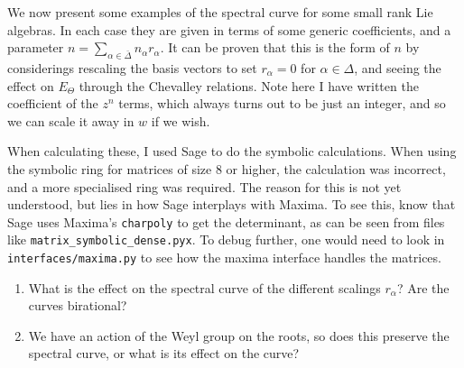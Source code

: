 \documentclass{article}
\begin{document}
We now present some examples of the spectral curve for some small rank Lie algebras. In each case they are given in terms of some generic coefficients, and a parameter $n = \sum_{\alpha \in \bar{\Delta}} n_\alpha r_\alpha$. It can be proven that this is the form of $n$ by considerings rescaling the basis vectors to set $r_\alpha=0$ for $\alpha \in \Delta$, and seeing the effect on $E_{\Theta}$ through the Chevalley relations.  
Note here I have written the coefficient of the $z^n$ terms, which always turns out to be just an integer, and so we can scale it away in $w$ if we wish. 
\begin{remark}
	When calculating these, I used Sage to do the symbolic calculations. When using the symbolic ring for matrices of size 8 or higher, the calculation was incorrect, and a more specialised ring was required. The reason for this is not yet understood, but lies in how Sage interplays with Maxima. To see this, know that Sage uses Maxima's \texttt{charpoly} to get the determinant, as can be seen from files like \texttt{matrix\_symbolic\_dense.pyx}. To debug further, one would need to look in \texttt{interfaces/maxima.py} to see how the maxima interface handles the matrices. 
\end{remark}
\begin{enumerate}
	\item What is the effect on the spectral curve of the different scalings $r_\alpha$? Are the curves birational?
	\item We have an action of the Weyl group on the roots, so does this preserve the spectral curve, or what is its effect on the curve? 
\end{enumerate}
\end{document}
